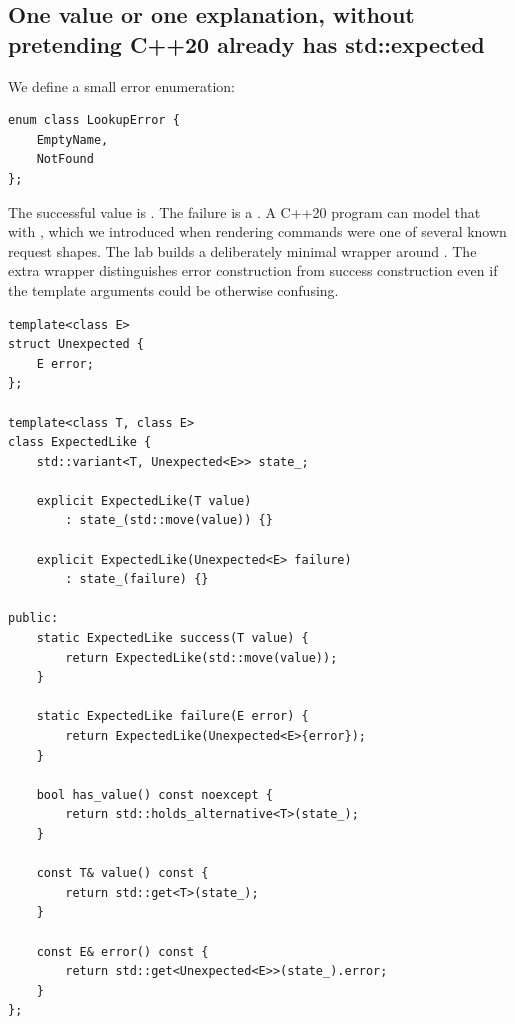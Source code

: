 \subsection{One value or one explanation, without pretending C++20 already has std::expected}\label{05-engine-i-ch006-one-value-or-one-explanation-without-pretending-c20-already-has-stdexpected}

\hypertarget{05-engine-i-ch006-one-value-or-one-explanation-without-pretending-c20-already-has-stdexpected}{}

We define a small error enumeration:

\begin{verbatim}
enum class LookupError {
    EmptyName,
    NotFound
};
\end{verbatim}

The successful value is . The failure is a . A C++20 program can model that with , which we introduced when rendering commands were one of several known request shapes. The lab builds a deliberately minimal  wrapper around . The extra  wrapper distinguishes error construction from success construction even if the template arguments could be otherwise confusing.

\begin{verbatim}
template<class E>
struct Unexpected {
    E error;
};

template<class T, class E>
class ExpectedLike {
    std::variant<T, Unexpected<E>> state_;

    explicit ExpectedLike(T value)
        : state_(std::move(value)) {}

    explicit ExpectedLike(Unexpected<E> failure)
        : state_(failure) {}

public:
    static ExpectedLike success(T value) {
        return ExpectedLike(std::move(value));
    }

    static ExpectedLike failure(E error) {
        return ExpectedLike(Unexpected<E>{error});
    }

    bool has_value() const noexcept {
        return std::holds_alternative<T>(state_);
    }

    const T& value() const {
        return std::get<T>(state_);
    }

    const E& error() const {
        return std::get<Unexpected<E>>(state_).error;
    }
};
\end{verbatim}

